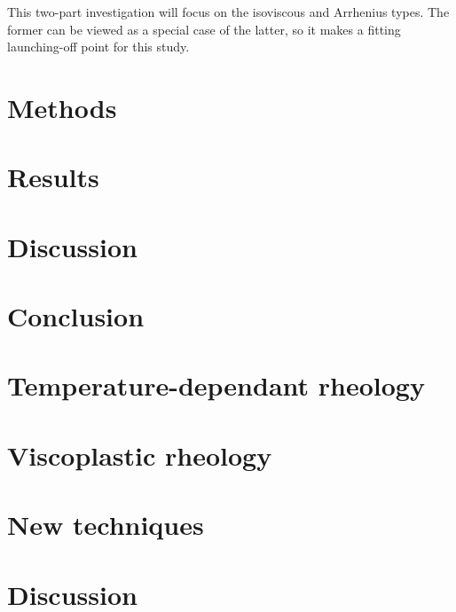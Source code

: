 \documentclass[a4paper,11pt,oneside]{book}
\begin{document}
This two-part investigation will focus on the isoviscous and Arrhenius types. The former can be viewed as a special case of the latter, so it makes a fitting launching-off point for this study.

\section{Methods}

\section{Results}

\section{Discussion}

\section{Conclusion}

\section{Temperature-dependant rheology}

\section{Viscoplastic rheology}

\section{New techniques}

\section{Discussion}
\end{document}
